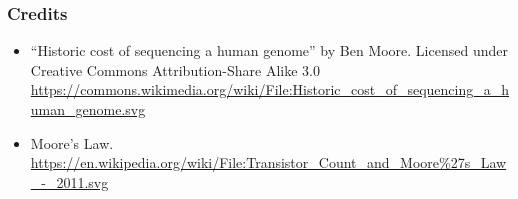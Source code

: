 \begin{frame}\frametitle{Credits}
\begin{itemize}
\item
``Historic cost of sequencing a human genome'' by Ben Moore. Licensed under Creative Commons Attribution-Share Alike 3.0 \tiny\url{https://commons.wikimedia.org/wiki/File:Historic_cost_of_sequencing_a_human_genome.svg}
\item
Moore's Law.
\tiny\url{https://en.wikipedia.org/wiki/File:Transistor_Count_and_Moore\%27s_Law_-_2011.svg}
\end{itemize}
\end{frame}



